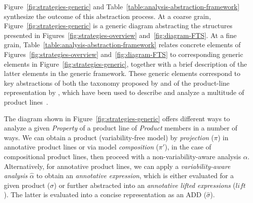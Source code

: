 Figure~\ref{fig:strategies-generic} and Table~\ref{table:analysis-abstraction-framework} synthesize the outcome of this abstraction process. 
At a coarse grain, Figure~\ref{fig:strategies-generic} is a generic diagram abstracting the structures presented in  Figures~\ref{fig:strategies-overview} and~\ref{fig:diagram-FTS}. At a fine grain, Table~\ref{table:analysis-abstraction-framework} relates concrete elements of Figures~\ref{fig:strategies-overview} and~\ref{fig:diagram-FTS} to corresponding generic elements in Figure~\ref{fig:strategies-generic}, together with a brief 
description of the latter elements in the generic framework.
These generic elements correspond to key abstractions of both the taxonomy proposed by
\citet{Thum2014} and of the product-line representation by \citet{Kastner2008}, which have been used to describe and analyze a multitude of product lines~\cite{Thum2014}.


The diagram shown in Figure~\ref{fig:strategies-generic} offers different ways to analyze a given \textit{Property} of a product line of \textit{Product} members in a number of ways. 
We can obtain a product (variability-free model) by \textit{projection} ($\pi$) in annotative product lines or via model \textit{composition} ($\pi'$), in the case of compositional product lines, then  proceed with a non-variability-aware analysis $\alpha$.
Alternatively, for annotative product lines, we can apply a \textit{variability-aware analysis} $\mathit{\hat{\alpha}}$ to obtain an \textit{annotative expression}, which is either evaluated for a given product ($\sigma$) or further abstracted into an \textit{annotative lifted expressions} ($\mathit{lift}$). The latter is evaluated into a concise representation as an ADD ($\hat{\sigma}$). 

